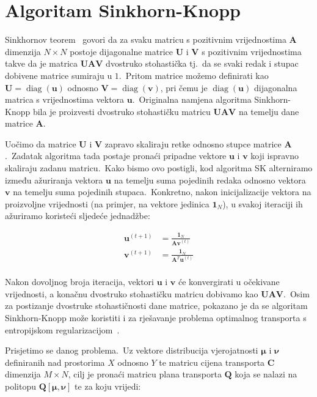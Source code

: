 \documentclass[diplomskirad]{fer}
\begin{document}
\section{Algoritam Sinkhorn-Knopp}
\label{sek:sk_alg}

Sinkhornov teorem~\cite{sinkhorn1964relationship} govori da za svaku matricu s pozitivnim vrijednostima $\bm{A}$ dimenzija $N \times N$ postoje dijagonalne matrice $\bm{U}$ i $\bm{V}$ s pozitivnim vrijednostima takve da je matrica $\bm{U} \bm{A} \bm{V}$ dvostruko stohastička tj.\ da se svaki redak i stupac dobivene matrice sumiraju u $1$.\ 
Pritom matrice možemo definirati kao $\bm{U} = \operatorname{diag}(\bm{u})$ odnosno $\bm{V} = \operatorname{diag}(\bm{v})$, pri čemu je $\operatorname{diag}(\bm{u})$ dijagonalna matrica s vrijednostima vektora $\bm{u}$.\ 
Originalna namjena algoritma Sinkhorn-Knopp bila je proizvesti dvostruko stohastičku matricu $\bm{U} \bm{A} \bm{V}$ na temelju dane matrice $\bm{A}$.\ 
  
Uočimo da matrice $\bm{U}$ i $\bm{V}$ zapravo skaliraju retke odnosno stupce matrice $\bm{A}$.\ Zadatak algoritma tada postaje pronaći pripadne vektore $\bm{u}$ i $\bm{v}$ koji ispravno skaliraju zadanu matricu.\ 
Kako bismo ovo postigli, kod algoritma SK alterniramo između ažuriranja vektora $\bm{u}$ na temelju suma pojedinih redaka odnosno vektora $\bm{v}$ na temelju suma pojedinih stupaca.\
Konkretno, nakon inicijalizacije vektora na proizvoljne vrijednosti (na primjer, na vektore jedinica $\bm{1}_N$), u svakoj iteraciji ih ažuriramo koristeći sljedeće jednadžbe:

\begin{equation}
  \begin{aligned}
    \bm{u}^{(t + 1)} &= \frac{\bm{1}_N}{\bm{A} \bm{v}^{(t)}} \\
    \bm{v}^{(t + 1)} &= \frac{\bm{1}_N}{\bm{A}^T \bm{u}^{(t)}} \\
  \end{aligned}
  \label{eq:sk_basic_form}
\end{equation}

Nakon dovoljnog broja iteracija, vektori $\bm{u}$ i $\bm{v}$ će konvergirati u očekivane vrijednosti, a konačnu dvostruko stohastičku matricu dobivamo kao $\bm{U} \bm{A} \bm{V}$.\ 
Osim za postizanje dvostruke stohastičnosti dane matrice, pokazano je da se algoritam Sinkhorn-Knopp može koristiti i za rješavanje problema optimalnog transporta s entropijskom regularizacijom~\cite{cuturi2013sinkhorn}.\ 

Prisjetimo se danog problema.\ Uz vektore distribucija vjerojatnosti $\bm{\mu}$ i $\bm{\nu}$ definiranih nad prostorima $X$ odnosno $Y$ te matricu cijena transporta $\bm{C}$ dimenzija $M \times N$, cilj je pronaći matricu plana transporta $\bm{Q}$ koja se nalazi na politopu $\bm{Q}\left[ \bm{\mu}, \bm{\nu} \right]$ te za koju vrijedi:
\end{document}
